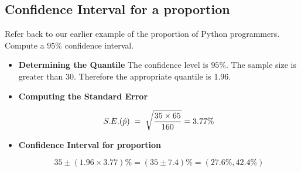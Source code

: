 \documentclass[a4paper,12pt]{article}
\begin{document}
\subsection*{Confidence Interval for a proportion}

Refer back to our earlier example of the proportion of Python programmers. Compute a $95\%$ confidence interval.\\

\begin{itemize}
    \item \textbf{Determining the Quantile}
The confidence level is $95\%$. The sample size is greater than 30. Therefore the appropriate quantile is 1.96.\\
\item 
\textbf{Computing the Standard Error}

\[
S.E. (\hat{p}) \;=\; \sqrt{ {35 \times 65 \over 160 }} =  3.77\%
\] \bigskip

\item \textbf{Confidence Interval for proportion}

\[
35 \pm (1.96 \times 3.77) \%  = (35 \pm7.4) \% = (27.6\%,42.4\%)
\]
\end{itemize}
\end{document}
